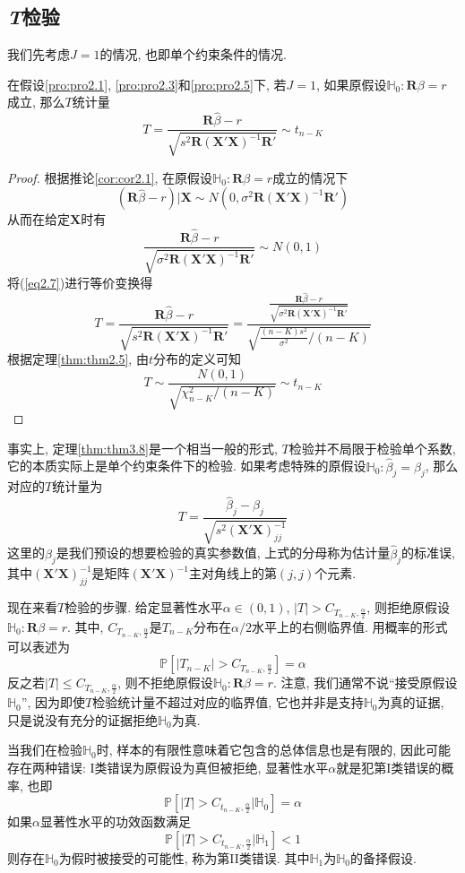 \documentclass[cn, 12pt, math=mtpro2, bibstyle=apa, blue, twocol]{elegantbook}
\newcommand{\RH}{\mathbold{R}}
\newcommand{\PP}{\mathbb{P}}
\newcommand{\X}{\mathbold{X}}
\newcommand{\hb}{\hat{\beta}}
\newcommand{\HH}{\mathbb{H}}
\begin{document}
\subsection{\emph{T}检验}
我们先考虑$J=1$的情况, 也即单个约束条件的情况.
\begin{theorem}[$T$统计量的分布]\label{thm:thm3.8}
  在假设\ref{pro:pro2.1}, \ref{pro:pro2.3}和\ref{pro:pro2.5}下, 若$J=1$, 如果原假设$\HH_0:\RH\beta=r$成立, 那么$T$统计量
  \begin{equation}\label{eq2.6}
    T=\frac{\RH\hb-r}{\sqrt{s^2\RH(\X'\X)^{-1}\RH'}}\sim t_{n-K}
  \end{equation}
\end{theorem}
\begin{proof}
  根据推论\ref{cor:cor2.1}, 在原假设$\HH_0:\RH\beta=r$成立的情况下
  $$(\RH\hb-r)|\X\sim N(0,\sigma^2\mathbold{R}(\X'\X)^{-1}\mathbold{R}')$$
  从而在给定$\X$时有
  $$\frac{\RH\hb-r}{\sqrt{\sigma^2\RH(\X'\X)^{-1}\RH'}}\sim N(0,1)$$
  将(\ref{eq2.7})进行等价变换得
  $$T=\frac{\RH\hb-r}{\sqrt{s^2\RH(\X'\X)^{-1}\RH'}}=\frac{\displaystyle\frac{\RH\hb-r}{\sqrt{\sigma^2\RH(\X'\X)^{-1}\RH'}}}{\displaystyle \sqrt{ \frac{(n-K)s^2}{\sigma^2}/(n-K)}}$$
  根据定理\ref{thm:thm2.5}, 由$t$分布的定义可知
  $$T\sim \frac{N(0,1)}{\sqrt{\chi^2_{n-K}/(n-K)}}\sim t_{n-K}$$
\end{proof}
\begin{remark}
事实上, 定理\ref{thm:thm3.8}是一个相当一般的形式, $T$检验并不局限于检验单个系数, 它的本质实际上是单个约束条件下的检验. 如果考虑特殊的原假设$\HH_0: \hat{\beta}_j=\beta_j$, 那么对应的$T$统计量为
$$T=\frac{\hat{\beta}_j-\beta_j}{\sqrt{s^2(\X'\X)_{jj}^{-1}}}$$
这里的$\beta_j$是我们预设的想要检验的真实参数值, 上式的分母称为估计量$\hb_j$的标准误, 其中$(\X'\X)_{jj}^{-1}$是矩阵$(\X'\X)^{-1}$主对角线上的第$(j,j)$个元素.
\end{remark}

现在来看$T$检验的步骤. 给定显著性水平$\alpha\in(0,1)$, $|T|>C_{T_{n-K},\frac{\alpha}{2}}$, 则拒绝原假设$\HH_0:\RH\beta=r$. 其中, $C_{T_{n-K},\frac{\alpha}{2}}$是$T_{n-K}$分布在$\alpha/2$水平上的右侧临界值. 用概率的形式可以表述为
$$\PP[|T_{n-K}|>C_{T_{n-K},\frac{\alpha}{2}}]=\alpha$$
反之若$|T|\leq C_{T_{n-K},\frac{\alpha}{2}}$, 则不拒绝原假设$\HH_0:\RH\beta=r$. 注意, 我们通常不说“接受原假设$\HH_0$”, 因为即使$T$检验统计量不超过对应的临界值, 它也并非是支持$\HH_0$为真的证据, 只是说没有充分的证据拒绝$\HH_0$为真.

当我们在检验$\HH_0$时, 样本的有限性意味着它包含的总体信息也是有限的, 因此可能存在两种错误: I类错误为原假设为真但被拒绝, 显著性水平$\alpha$就是犯第I类错误的概率, 也即
$$\PP[|T|>C_{t_{n-K},\frac{\alpha}{2}}|\HH_0]=\alpha$$
如果$\alpha$显著性水平的功效函数满足
$$\PP[|T|>C_{t_{n-K},\frac{\alpha}{2}}|\HH_1]<1$$
则存在$\HH_0$为假时被接受的可能性, 称为第II类错误. 其中$\HH_1$为$\HH_0$的备择假设.
\end{document}
